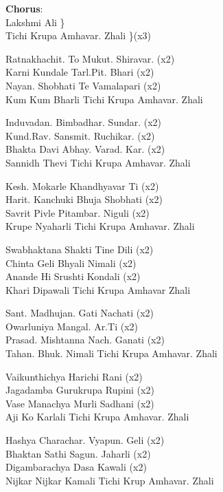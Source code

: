 
{\bf Chorus}: \\
Lakshmi Ali \} \\
Tichi Krupa Amhavar. Zhali \}(x3) \linebreak[2]

Ratnakhachit. To Mukut. Shiravar. (x2) \\
Karni Kundale Tarl.Pit. Bhari (x2) \\
Nayan. Shobhati Te Vamalapari (x2) \\
Kum Kum Bharli Tichi Krupa Amhavar. Zhali \linebreak[2]

Induvadan. Bimbadhar. Sundar. (x2) \\
Kund.Rav. Sansmit. Ruchikar. (x2) \\
Bhakta Davi Abhay. Varad. Kar. (x2) \\
Sannidh Thevi Tichi Krupa Amhavar. Zhali \linebreak[2]

Kesh. Mokarle Khandhyavar Ti (x2) \\
Harit. Kanchuki Bhuja Shobhati (x2) \\
Savrit Pivle Pitambar. Niguli (x2) \\
Krupe Nyaharli Tichi Krupa Amhavar. Zhali \linebreak[2]

Swabhaktana Shakti Tine Dili (x2) \\
Chinta Geli Bhyali Nimali (x2) \\
Anande Hi Srushti Kondali (x2) \\
Khari Dipawali Tichi Krupa Amhavar Zhali \linebreak[2]

Sant. Madhujan. Gati Nachati (x2) \\
Owarluniya Mangal. Ar.Ti (x2) \\
Prasad. Mishtanna Nach. Ganati (x2) \\
Tahan. Bhuk. Nimali Tichi Krupa Amhavar. Zhali \linebreak[2]

Vaikunthichya Harichi Rani (x2) \\
Jagadamba Gurukrupa Rupini (x2) \\
Vase Manachya Murli Sadhani (x2) \\
Aji Ko Karlali Tichi Krupa Amhavar. Zhali \linebreak[2]

Hashya Charachar. Vyapun. Geli (x2) \\
Bhaktan Sathi Sagun. Jaharli (x2) \\
Digambarachya Dasa Kawali (x2) \\
Nijkar Nijkar Kamali Tichi Krup Amhavar. Zhali

\newpage